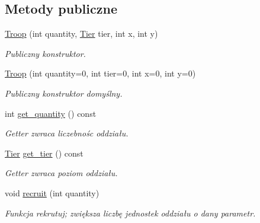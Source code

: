 \subsection*{Metody publiczne}
\begin{DoxyCompactItemize}
\item 
\hyperlink{classmodel_1_1Troop_a9aa71eb10b8f3493f65dccd3d63cd7fa}{Troop} (int quantity, \hyperlink{tier_8hpp_a50a003ab1ea342f138c038fabfd1ee55}{Tier} tier, int x, int y)
\begin{DoxyCompactList}\small\item\em Publiczny konstruktor. \end{DoxyCompactList}\item 
\hyperlink{classmodel_1_1Troop_a8d7d76671d2cb6ffbd925bd91a1b4f24}{Troop} (int quantity=0, int tier=0, int x=0, int y=0)
\begin{DoxyCompactList}\small\item\em Publiczny konstruktor domyślny. \end{DoxyCompactList}\item 
\mbox{\label{classmodel_1_1Troop_a8cbe812e8dd34a14458edca42d46a9c9}} 
int \hyperlink{classmodel_1_1Troop_a8cbe812e8dd34a14458edca42d46a9c9}{get\+\_\+quantity} () const
\begin{DoxyCompactList}\small\item\em Getter zwraca liczebnośc oddziału. \end{DoxyCompactList}\item 
\mbox{\label{classmodel_1_1Troop_afa9b13ca99af4fb5a279a01e0e2a4a7e}} 
\hyperlink{tier_8hpp_a50a003ab1ea342f138c038fabfd1ee55}{Tier} \hyperlink{classmodel_1_1Troop_afa9b13ca99af4fb5a279a01e0e2a4a7e}{get\+\_\+tier} () const
\begin{DoxyCompactList}\small\item\em Getter zwraca poziom oddziału. \end{DoxyCompactList}\item 
\mbox{\label{classmodel_1_1Troop_adbec03b9cb80420608e630658bca2634}} 
void \hyperlink{classmodel_1_1Troop_adbec03b9cb80420608e630658bca2634}{recruit} (int quantity)
\begin{DoxyCompactList}\small\item\em Funkcja rekrutuj; zwiększa liczbę jednostek oddziału o dany parametr. \end{DoxyCompactList}\item 

\end{DoxyCompactItemize}
